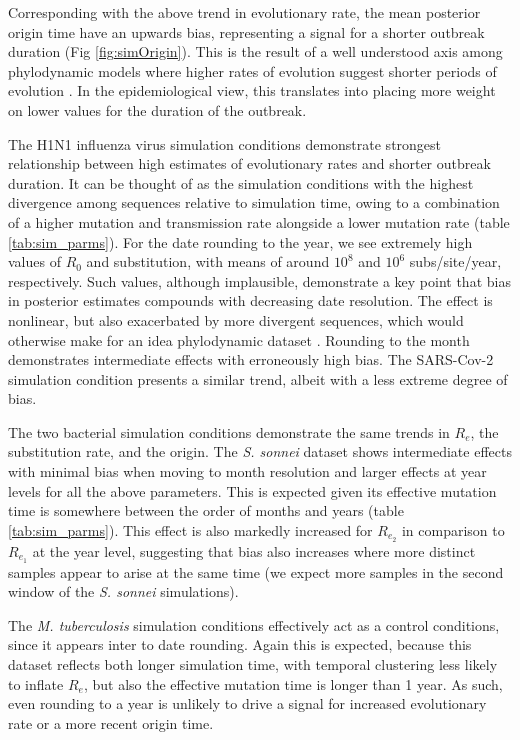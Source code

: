\documentclass{article}
\begin{document}
\begin{spacing}{1.5}
Corresponding with the above trend in evolutionary rate, the mean posterior origin time have an  upwards bias, representing a signal for a shorter outbreak duration (Fig \ref{fig:simOrigin}). This is the result of a well understood axis among phylodynamic models where higher rates of evolution suggest shorter periods of evolution \citep{featherstone_decoding_2023}. In the epidemiological view, this translates into placing more weight on lower values for the duration of the outbreak.

The H1N1 influenza virus simulation conditions demonstrate strongest relationship between high estimates of evolutionary rates and shorter outbreak duration. It can be thought of as the simulation conditions with the highest divergence among sequences relative to simulation time, owing to a combination of a higher mutation and transmission rate alongside a lower mutation rate (table \ref{tab:sim_parms}). For the date rounding to the year, we see extremely high values of $R_0$ and substitution, with means of around $10^{8}$ and $10^{6}$ subs/site/year, respectively. Such values, although implausible, demonstrate a key point that bias in posterior estimates compounds with decreasing date resolution. The effect is nonlinear, but also exacerbated by more divergent sequences, which would otherwise make for an idea phylodynamic dataset \citep{featherstone_decoding_2023}. Rounding to the month demonstrates intermediate effects with erroneously high bias. The SARS-Cov-2 simulation condition presents a similar trend, albeit with a less extreme degree of bias. 

The two bacterial simulation conditions demonstrate the same trends in $R_e$, the substitution rate, and the origin. The \textit{S. sonnei} dataset shows intermediate effects with minimal bias when moving to month resolution and larger effects at year levels for all the above parameters. This is expected given its effective mutation time is somewhere between the order of months and years (table \ref{tab:sim_parms}). This effect is also markedly increased for $R_{e_2}$ in comparison to $R_{e_1}$ at the year level, suggesting that bias also increases where more distinct samples appear to arise at the same time (we expect more samples in the second window of the \textit{S. sonnei} simulations).

The \textit{M. tuberculosis} simulation conditions effectively act as a control conditions, since it appears inter to date rounding. Again this is expected, because this dataset reflects both longer simulation time, with temporal clustering less likely to inflate $R_e$, but also the effective mutation time is longer than 1 year. As such, even rounding to a year is unlikely to drive a signal for increased evolutionary rate or a more recent origin time.


\end{spacing}
\end{document}
